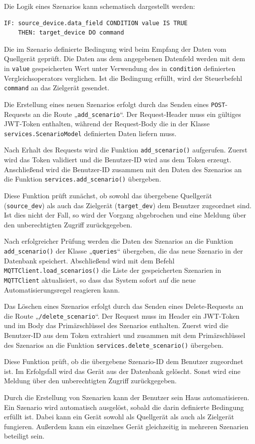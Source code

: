 \documentclass[12pt, letterpaper]{article}
\begin{document}
  \par Die Logik eines Szenarios kann schematisch dargestellt werden:
  \begin{Verbatim}[frame=single]
    IF: source_device.data_field CONDITION value IS TRUE
    THEN: target_device DO command
  \end{Verbatim}
  \par Die im Szenario definierte Bedingung wird beim Empfang der Daten vom Quellgerät geprüft. Die Daten aus dem angegebenen Datenfeld werden mit dem in \texttt{value} gespeicherten Wert unter Verwendung des in \texttt{condition} definierten Vergleichsoperators verglichen. Ist die Bedingung erfüllt, wird der Steuerbefehl \texttt{command} an das Zielgerät gesendet.
  \par Die Erstellung eines neuen Szenarios erfolgt durch das Senden eines \texttt{POST}-Requests an die Route „\texttt{add\_scenario}“. Der Request-Header muss ein gültiges JWT-Token enthalten, während der Request-Body die in der Klasse \texttt{services.ScenarioModel} definierten Daten liefern muss. 
  \par Nach Erhalt des Requests wird die Funktion \texttt{add\_scenario()} aufgerufen. Zuerst wird das Token validiert und die Benutzer-ID wird aus dem Token erzeugt. Anschließend wird die Benutzer-ID zusammen mit den Daten des Szenarios an die Funktion \texttt{services.add\_scenario()} übergeben.
  \par Diese Funktion prüft zunächst, ob sowohl das übergebene Quellgerät (\texttt{source\_dev}) als auch das Zielgerät (\texttt{target\_dev}) dem Benutzer zugeordnet sind. Ist dies nicht der Fall, so wird der Vorgang abgebrochen und eine Meldung über den unberechtigten Zugriff zurückgegeben.
  \par Nach erfolgreicher Prüfung werden die Daten des Szenarios an die Funktion \texttt{add\_scenario()} der Klasse „\texttt{queries}“ übergeben, die das neue Szenario in der Datenbank speichert. Abschließend wird mit dem Befehl \texttt{MQTTClient.load\_scenarios()} die Liste der gespeicherten Szenarien in \texttt{MQTTClient} aktualisiert, so dass das System sofort auf die neue Automatisierungsregel reagieren kann.
  \par Das Löschen eines Szenarios erfolgt durch das Senden eines Delete-Requests an die Route „\texttt{/delete\_scenario}“. Der Request muss im Header ein JWT-Token und im Body das Primär\-schlüssel des Szenarios enthalten. Zuerst wird die Benutzer-ID aus dem Token extrahiert und zusammen mit dem Primär\-schlüssel des Szenarios an die Funktion \texttt{services.delete\_scenario()} übergeben. 
  \par Diese Funktion prüft, ob die übergebene Szenario-ID dem Benutzer zugeordnet ist. Im Erfolgsfall wird das Gerät aus der Datenbank gelöscht. Sonst wird eine Meldung über den unberechtigten Zugriff zurückgegeben.
  \par Durch die Erstellung von Szenarien kann der Benutzer sein Haus automatisieren. Ein Szenario wird automatisch ausgelöst, sobald die darin definierte Bedingung erfüllt ist. Dabei kann ein Gerät sowohl als Quellgerät als auch als Zielgerät fungieren. Außerdem kann ein einzelnes Gerät gleichzeitig in mehreren Szenarien beteiligt sein.
\end{document}
